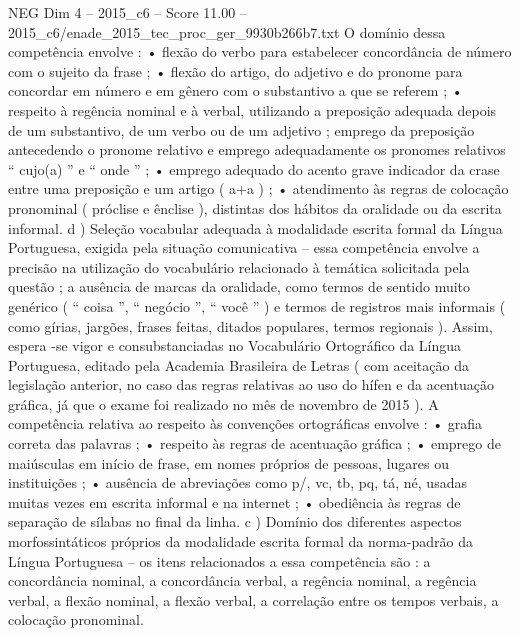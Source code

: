 \begin{textsample}{NEG Dim 4 – 2015\_c6 – Score 11.00 – 2015\_c6/enade\_2015\_tec\_proc\_ger\_9930b266b7.txt}
O domínio dessa competência envolve : • flexão do verbo para estabelecer concordância de número com o sujeito da frase ; • flexão do artigo, do adjetivo e do pronome para concordar em número e em gênero com o substantivo a que se referem ; • respeito à regência nominal e à verbal, utilizando a preposição adequada depois de um substantivo, de um verbo ou de um adjetivo ; emprego da preposição antecedendo o pronome relativo e emprego adequadamente os pronomes relativos “ cujo(a) ” e “ onde ” ; • emprego adequado do acento grave indicador da crase entre uma preposição e um artigo ( a+a ) ; • atendimento às regras de colocação pronominal ( próclise e ênclise ), distintas dos hábitos da oralidade ou da escrita informal. d ) Seleção vocabular adequada à modalidade escrita formal da Língua Portuguesa, exigida pela situação comunicativa – essa competência envolve a precisão na utilização do vocabulário relacionado à temática solicitada pela questão ; a ausência de marcas da oralidade, como termos de sentido muito genérico ( “ coisa ”, “ negócio ”, “ você ” ) e termos de registros mais informais ( como gírias, jargões, frases feitas, ditados populares, termos regionais ).
Assim, espera -se vigor e consubstanciadas no Vocabulário Ortográfico da Língua Portuguesa, editado pela Academia Brasileira de Letras ( com aceitação da legislação anterior, no caso das regras relativas ao uso do hífen e da acentuação gráfica, já que o exame foi realizado no mês de novembro de 2015 ).
A competência relativa ao respeito às convenções ortográficas envolve : • grafia correta das palavras ; • respeito às regras de acentuação gráfica ; • emprego de maiúsculas em início de frase, em nomes próprios de pessoas, lugares ou instituições ; • ausência de abreviações como p/, vc, tb, pq, tá, né, usadas muitas vezes em escrita informal e na internet ; • obediência às regras de separação de sílabas no final da linha. c ) Domínio dos diferentes aspectos morfossintáticos próprios da modalidade escrita formal da norma-padrão da Língua Portuguesa – os itens relacionados a essa competência são : a concordância nominal, a concordância verbal, a regência nominal, a regência verbal, a flexão nominal, a flexão verbal, a correlação entre os tempos verbais, a colocação pronominal.

\end{textsample}

